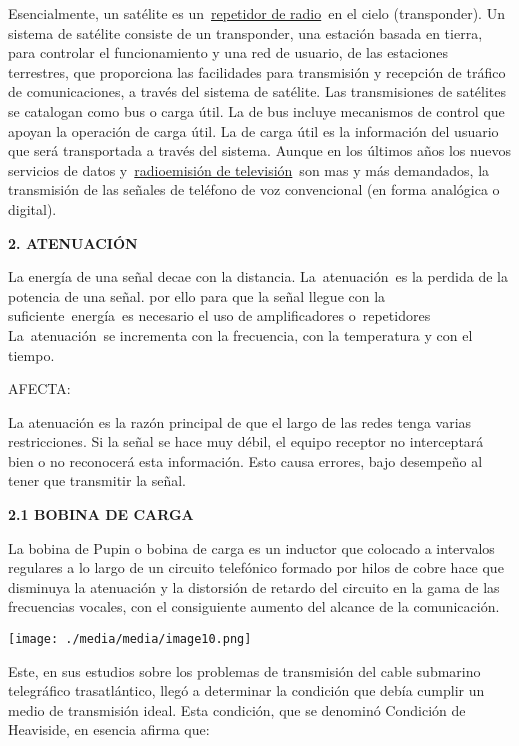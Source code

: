 Esencialmente, un satélite es
un~\href{https://www.ecured.cu/index.php?title=Repetidor_de_radio\&action=edit\&redlink=1}{repetidor
de radio}~en el cielo (transponder). Un sistema de satélite consiste de
un transponder, una estación basada en tierra, para controlar el
funcionamiento y una red de usuario, de las estaciones terrestres, que
proporciona las facilidades para transmisión y recepción de tráfico de
comunicaciones, a través del sistema de satélite. Las transmisiones de
satélites se catalogan como bus o carga útil. La de bus incluye
mecanismos de control que apoyan la operación de carga útil. La de carga
útil es la información del usuario que será transportada a través del
sistema. Aunque en los últimos años los nuevos servicios de datos
y~\href{https://www.ecured.cu/index.php?title=Radioemisi\%C3\%B3n_de_televisi\%C3\%B3n\&action=edit\&redlink=1}{radioemisión
de televisión}~son mas y más demandados, la transmisión de las señales
de teléfono de voz convencional (en forma analógica o digital).

\textbf{2. ATENUACIÓN}

La energía de una señal decae con la distancia. La~atenuación~es la
perdida de la potencia de una señal. por ello para que la señal llegue
con la suficiente~energía~es necesario el uso de amplificadores
o~repetidores~~ La~atenuación~se incrementa con la frecuencia, con la
temperatura y con el tiempo.

AFECTA:

La atenuación es la razón principal de que el largo de las redes tenga
varias restricciones. Si la señal se hace muy débil, el equipo receptor
no interceptará bien o no reconocerá esta información. Esto causa
errores, bajo desempeño al tener que transmitir la señal.

\textbf{2.1 BOBINA DE CARGA}

La bobina de Pupin o bobina de carga es un inductor que colocado a
intervalos regulares a lo largo de un circuito telefónico formado por
hilos de cobre hace que disminuya la atenuación y la distorsión de
retardo del circuito en la gama de las frecuencias vocales, con el
consiguiente aumento del alcance de la comunicación.

\texttt{[image: ./media/media/image10.png]}

Este, en sus estudios sobre los problemas de transmisión del cable
submarino telegráfico trasatlántico, llegó a determinar la condición que
debía cumplir un medio de transmisión ideal. Esta condición, que se
denominó Condición de Heaviside, en esencia afirma que:

